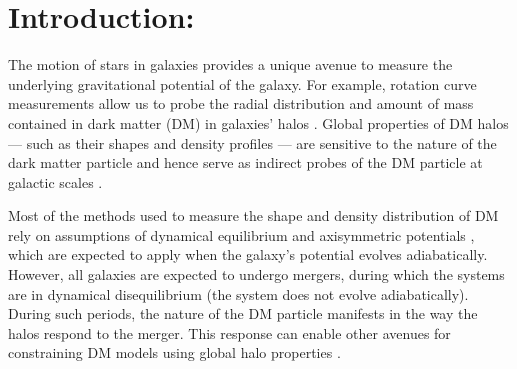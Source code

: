 \documentclass[twocolumn, linenumbers]{openjournal}
\begin{document}
\keywords{}


\section{Introduction:}\label{sec:intro}


The motion of stars in galaxies provides a unique avenue to measure the underlying
gravitational potential of the galaxy. For example, rotation curve measurements allow us to
probe the radial distribution and amount of mass contained in dark matter (DM) in galaxies' halos
\citep[e.g.,][]{Eilers_19}.  Global properties of DM halos --- such as their shapes and density
profiles --- are sensitive to the nature of the dark matter particle and hence serve as indirect 
probes of the DM particle at galactic scales \citep[e.g.,][]{Despali_22, Vargya_22, Gonzalez_24}.

Most of the methods used to measure the shape and density distribution of DM rely on assumptions of
dynamical equilibrium and axisymmetric potentials \citep[e.g.,][]{Prada_19, Emami_21}, which are 
expected to apply when the galaxy's potential evolves adiabatically. However, all galaxies are 
expected to undergo mergers, during which the systems are in dynamical disequilibrium (the system 
does not evolve adiabatically). During such periods, the nature of the DM particle manifests in the 
way the halos respond to the merger. This response can enable other avenues for constraining DM models 
using global halo properties \citep[e.g.,][]{Furlanetto02}. 
\end{document}
